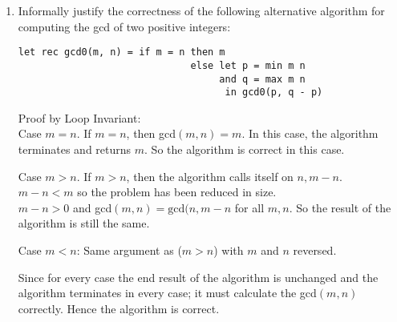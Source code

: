 \documentclass[10pt,\jkfside,a4paper]{article}
\begin{document}
\begin{enumerate}
\item Informally justify the correctness of the following alternative algorithm for computing the gcd of 
two positive integers:

\begin{verbatim}
let rec gcd0(m, n) = if m = n then m
							  else let p = min m n
								   and q = max m n
								    in gcd0(p, q - p)
\end{verbatim}

Proof by Loop Invariant:\\
Case $m = n$.
If $m = n$, then gcd$(m, n) = m$.
In this case, the algorithm terminates and returns $m$. So the algorithm is correct in this case.

Case $m > n$.\label{gcd0case2}
If $m > n$, then the algorithm calls itself on $n, m - n$. \\
$m - n < m$ so the problem has been reduced in size.\\
$m - n > 0$ and gcd$(m, n) = \text{gcd}(n, m - n$ for all $m, n$. So the result of the algorithm is still the same.

Case $m < n$:
Same argument as ($m > n$) with $m$ and $n$ reversed.

Since for every case the end result of the algorithm is unchanged and the algorithm terminates in every case; it must calculate 
the gcd$(m, n)$ correctly. Hence the algorithm is correct.

\end{enumerate}
\end{document}
